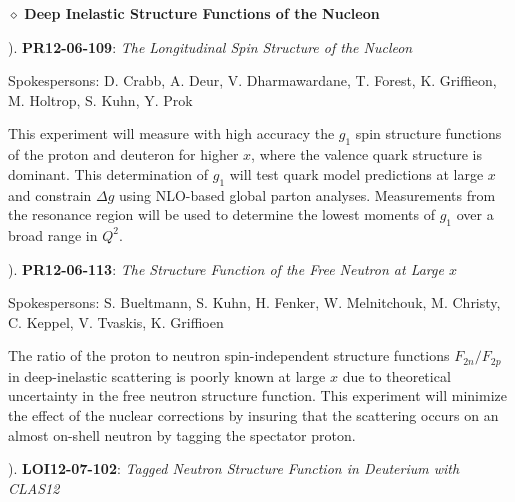 \vskip 0.5cm

\noindent
\begin{large}
$\diamond$ {\bf Deep Inelastic Structure Functions of the Nucleon}
\end{large}

\vskip 0.3cm

\begin{small}
). {\bf PR12-06-109}: {\it The Longitudinal Spin Structure of the
Nucleon}

\vskip 0.2cm

\begin{footnotesize}
Spokespersons: D. Crabb, A. Deur, V. Dharmawardane, T. Forest, K.
Griffieon, M. Holtrop, S. Kuhn, Y. Prok
\end{footnotesize}

\vskip 0.2cm

This experiment will measure with high accuracy the $g_1$ spin structure 
functions of the proton and deuteron for higher $x$, where the valence
quark structure is dominant.  This determination of $g_1$ will test 
quark model predictions at large $x$ and constrain $\Delta g$ using 
NLO-based global parton analyses.  Measurements from the resonance 
region will be used to determine the lowest moments of $g_1$ over a
broad range in $Q^2$.

\vskip 0.3cm

). {\bf PR12-06-113}: {\it The Structure Function of the Free
Neutron at Large $x$}

\vskip 0.2cm

\begin{footnotesize}
Spokespersons: S. Bueltmann, S. Kuhn, H. Fenker, W. Melnitchouk,
M. Christy, C. Keppel, V. Tvaskis, K. Griffioen
\end{footnotesize}

\vskip 0.2cm

The ratio of the proton to neutron spin-independent structure
functions $F_{2n}/F_{2p}$ in deep-inelastic scattering is poorly known 
at large $x$ due to theoretical uncertainty in the free neutron structure 
function.  This experiment will minimize the effect of the nuclear 
corrections by insuring that the scattering occurs on an almost on-shell 
neutron by tagging the spectator proton.

\vskip 0.3cm

). {\bf LOI12-07-102}: {\it Tagged Neutron Structure Function in
Deuterium with CLAS12}

\vskip 0.2cm


\end{small}
